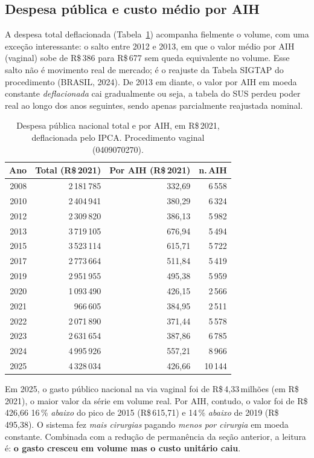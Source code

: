 \documentclass[12pt,a4paper,oneside]{article}
\newcommand{\rs}{R\$\,}
\begin{document}
\subsection{Despesa pública e custo médio por AIH}\label{sub:despesa}

A despesa total deflacionada (Tabela~\ref{tab:nat-val}) acompanha
fielmente o volume, com uma exceção interessante: o salto entre
2012 e 2013, em que o valor médio por AIH (vaginal) sobe de
\rs 386 para \rs 677 sem queda equivalente no volume. Esse salto
não é movimento real de mercado; é o reajuste da Tabela SIGTAP
do procedimento (BRASIL, 2024). De 2013 em diante, o valor por
AIH em moeda constante \textit{deflacionada} cai gradualmente
\textemdash{} ou seja, a tabela do SUS perdeu poder real ao
longo dos anos seguintes, sendo apenas parcialmente reajustada
nominal.

\begin{table}[H]
\centering
\caption{Despesa pública nacional total e por AIH, em \rs 2021,
deflacionada pelo IPCA. Procedimento vaginal (0409070270).}
\label{tab:nat-val}
\small
\begin{tabular}{rrrr}
\toprule
\textbf{Ano} & \textbf{Total (R\$\,2021)} & \textbf{Por AIH (R\$\,2021)} & \textbf{n.\,AIH} \\
\midrule
2008 & 2\,181\,785 & 332{,}69 &  6\,558 \\
2010 & 2\,404\,941 & 380{,}29 &  6\,324 \\
2012 & 2\,309\,820 & 386{,}13 &  5\,982 \\
2013 & 3\,719\,105 & 676{,}94 &  5\,494 \\
2015 & 3\,523\,114 & 615{,}71 &  5\,722 \\
2017 & 2\,773\,664 & 511{,}84 &  5\,419 \\
2019 & 2\,951\,955 & 495{,}38 &  5\,959 \\
2020 & 1\,093\,490 & 426{,}15 &  2\,566 \\
2021 &   966\,605 & 384{,}95 &  2\,511 \\
2022 & 2\,071\,890 & 371{,}44 &  5\,578 \\
2023 & 2\,631\,654 & 387{,}86 &  6\,785 \\
2024 & 4\,995\,926 & 557{,}21 &  8\,966 \\
2025 & 4\,328\,034 & 426{,}66 & 10\,144 \\
\bottomrule
\end{tabular}
\end{table}

Em 2025, o gasto público nacional na via vaginal foi de
\rs 4{,}33\,milhões (em \rs 2021), o maior valor da série
em volume real. Por AIH, contudo, o valor foi de \rs 426{,}66
\textemdash{} 16\,\% \textit{abaixo} do pico de 2015
(\rs 615{,}71) e 14\,\% \textit{abaixo} de 2019 (\rs 495{,}38).
O sistema fez \textit{mais cirurgias} pagando \textit{menos por
cirurgia} em moeda constante. Combinada com a redução de
permanência da seção anterior, a leitura é:
\textbf{o gasto cresceu em volume mas o custo unitário caiu}.
\end{document}
